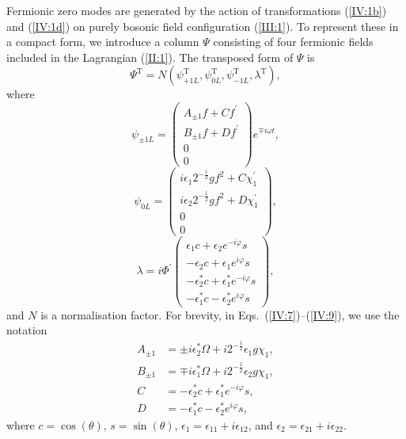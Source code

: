 Fermionic  zero  modes  are   generated   by   the  action  of  transformations
(\ref{IV:1b}) and  (\ref{IV:1d})   on   purely   bosonic   field  configuration
(\ref{III:1}).
To represent these in a compact form,  we  introduce a column $\Psi$ consisting
of four fermionic fields included in the Lagrangian (\ref{II:1}).
The transposed form of $\Psi$ is
\begin{equation}
\Psi^{\text{T}} = N\left(\psi_{+1 L}^{\text{T}},\psi_{0 L}^{\text{T}},
\psi_{-1 L}^{\text{T}},\lambda^{\text{T}}\right),                  \label{IV:6}
\end{equation}
where
\begin{equation}
\psi _{\pm 1 L}=
\begin{pmatrix}
A_{\pm 1}f+Cf^{\prime } \\
B_{\pm 1}f+Df^{\prime } \\
0 \\
0%
\end{pmatrix}
e^{\mp i\omega t},                                                 \label{IV:7}
\end{equation}
\begin{equation}
\psi _{0 L}=%
\begin{pmatrix}
i\epsilon _{1}2^{-\frac{1}{2}}gf^{2}+C\chi _{1}^{\prime } \\
i\epsilon _{2}2^{-\frac{1}{2}}gf^{2}+D\chi _{1}^{\prime } \\
0 \\
0%
\end{pmatrix},                                                     \label{IV:8}
\end{equation}
\begin{equation}
\lambda =i\Phi ^{\prime }%
\begin{pmatrix}
\epsilon _{1}c+\epsilon _{2}e^{-i\varphi }s \\
-\epsilon _{2}c+\epsilon _{1}e^{i\varphi }s \\
-\epsilon _{2}^{\ast }c+\epsilon _{1}^{\ast }e^{-i\varphi }s \\
-\epsilon _{1}^{\ast }c-\epsilon _{2}^{\ast }e^{i\varphi }s%
\end{pmatrix},                                                     \label{IV:9}
\end{equation}
and $N$ is a normalisation factor.
For brevity, in Eqs.~(\ref{IV:7})--(\ref{IV:9}), we use the notation
\begin{subequations}                                              \label{IV:10}
\begin{flalign}
A_{\pm 1} & =\pm i\epsilon _{2}^{\ast }\Omega +i2^{-\frac{1}{2}}\epsilon
_{1}g\chi _{1}, \\
B_{\pm 1} & =\mp i\epsilon _{1}^{\ast }\Omega +i2^{-\frac{1}{2}}\epsilon
_{2}g\chi _{1}, \\
C &= -\epsilon _{2}^{\ast }c+\epsilon _{1}^{\ast }e^{-i\varphi }s, \\
D &= -\epsilon _{1}^{\ast }c-\epsilon _{2}^{\ast }e^{i\varphi }s,
\end{flalign}
\end{subequations}
where $c = \cos(\theta)$,  $s = \sin(\theta)$,  $\epsilon_{1} = \epsilon_{11} +
i\epsilon_{12}$,  and  $\epsilon_{2} = \epsilon_{21} + i \epsilon_{22}$.


